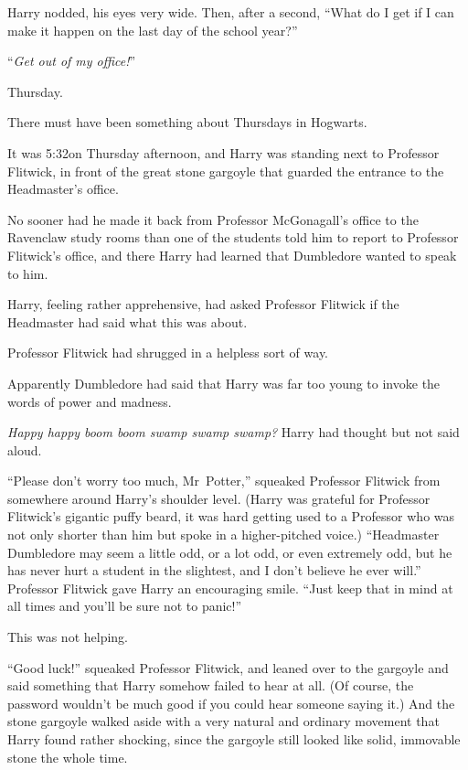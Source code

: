 Harry nodded, his eyes very wide. Then, after a second,
“What do I get if I can make it happen on the last day of the school year?”

“\emph{Get out of my office!}”

\later

Thursday.

There must have been something about Thursdays in Hogwarts.

It was 5:32\pm on Thursday afternoon, and Harry was standing next to Professor Flitwick, in front of the great stone gargoyle that guarded the entrance to the Headmaster’s office.

No sooner had he made it back from Professor McGonagall’s office to the Ravenclaw study rooms than one of the students told him to report to Professor Flitwick’s office, and there Harry had learned that Dumbledore wanted to speak to him.

Harry, feeling rather apprehensive, had asked Professor Flitwick if the Headmaster had said what this was about.

Professor Flitwick had shrugged in a helpless sort of way.

Apparently Dumbledore had said that Harry was far too young to invoke the words of power and madness.

\emph{Happy happy boom boom swamp swamp swamp?} Harry had thought but not said aloud.

“Please don’t worry too much, Mr~Potter,” squeaked Professor Flitwick from somewhere around Harry’s shoulder level. (Harry was grateful for Professor Flitwick’s gigantic puffy beard, it was hard getting used to a Professor who was not only shorter than him but spoke in a higher-pitched voice.)
“Headmaster Dumbledore may seem a little odd, or a lot odd, or even extremely odd, but he has never hurt a student in the slightest, and I don’t believe he ever will.” Professor Flitwick gave Harry an encouraging smile.
“Just keep that in mind at all times and you’ll be sure not to panic!”

This was not helping.

“Good luck!” squeaked Professor Flitwick, and leaned over to the gargoyle and said something that Harry somehow failed to hear at all. (Of course, the password wouldn’t be much good if you could hear someone saying it.) And the stone gargoyle walked aside with a very natural and ordinary movement that Harry found rather shocking, since the gargoyle still looked like solid, immovable stone the whole time.


